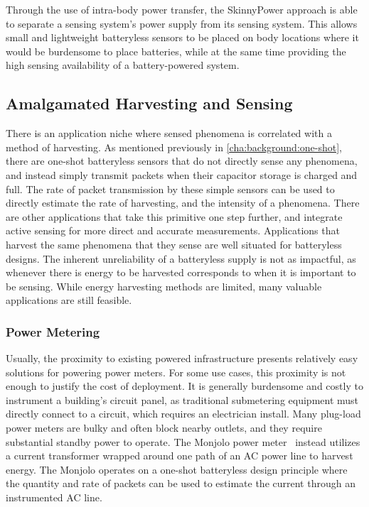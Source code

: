 Through the use of intra-body power transfer, the SkinnyPower approach is able to separate a sensing system's power supply from its sensing system. This allows small and lightweight batteryless sensors to be placed on body locations where it would be burdensome to place batteries, while at the same time providing the high sensing availability of a battery-powered system.

\subsection{Amalgamated Harvesting and Sensing}
There is an application niche where sensed phenomena is correlated with a method of harvesting.
As mentioned previously in \cref{cha:background:one-shot}, there are one-shot batteryless sensors that do not directly sense any phenomena, and instead simply transmit packets when their capacitor storage is charged and full.
The rate of packet transmission by these simple sensors can be used to directly estimate the rate of harvesting, and the intensity of a phenomena.
There are other applications that take this primitive one step further, and integrate active sensing for more direct and accurate measurements.
Applications that harvest the same phenomena that they sense are well situated for batteryless designs.
The inherent unreliability of a batteryless supply is not as impactful, as whenever there is energy to be harvested corresponds to when it is important to be sensing.
While energy harvesting methods are limited, many valuable applications are still feasible.

\subsubsection{Power Metering}
Usually, the proximity to existing powered infrastructure presents relatively easy solutions for powering power meters.
For some use cases, this proximity is not enough to justify the cost of deployment.
It is generally burdensome and costly to instrument a building's circuit panel, as traditional submetering equipment must directly connect to a circuit, which requires an electrician install.
Many plug-load power meters are bulky and often block nearby outlets, and they require substantial standby power to operate.
The Monjolo power meter~\cite{debruin2013monjolo} instead utilizes a current transformer wrapped around one path of an AC power line to harvest energy.
The Monjolo operates on a one-shot batteryless design principle where the quantity and rate of packets can be used to estimate the current through an instrumented AC line.


